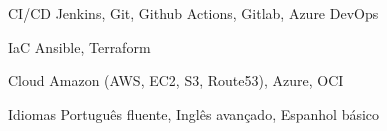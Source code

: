 \begin{cvskills}
\cvskill
    {CI/CD} %
    {Jenkins, Git, Github Actions, Gitlab, Azure DevOps} %


\cvskill
    {IaC} %
    {Ansible, Terraform} %

\cvskill
    {Cloud} %
    {Amazon (AWS, EC2, S3, Route53), Azure, OCI} %


  \cvskill
    {Idiomas} %
    {Português fluente, Inglês avançado, Espanhol básico} %

\end{cvskills}